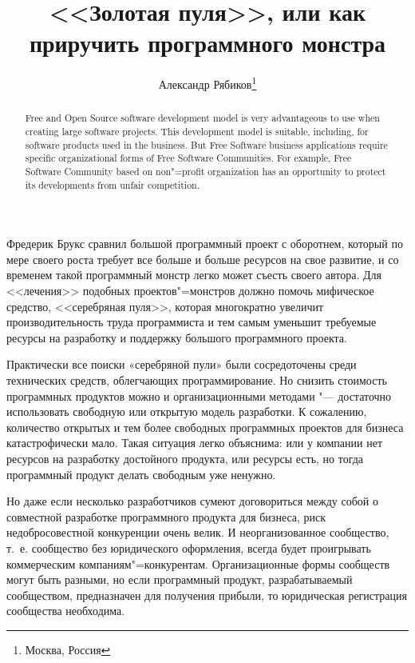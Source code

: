 \documentclass[10pt, a5paper]{article}
\begin{document}
\title{<<Золотая пуля>>, или как приручить программного монстра}%

\author{Александр Рябиков\footnote{Москва, Россия}}
\maketitle

\begin{abstract}
Free and Open Source software development model is very advantageous to use when creating large software projects. This development model is suitable, including, for software products used in the business. But Free Software business applications require specific organizational forms of Free Software Communities. For example, Free Software Community based on non"=profit organization has an opportunity to protect its developments from unfair competition.
\end{abstract}

Фредерик Брукс сравнил большой программный проект с оборотнем, который по мере своего роста требует все больше и больше ресурсов на свое развитие, и со временем такой программный монстр легко может съесть своего автора. Для <<лечения>> подобных проектов"=монстров должно помочь мифическое средство, <<серебряная пуля>>, которая многократно увеличит производительность труда программиста и тем самым уменьшит требуемые ресурсы на разработку и поддержку большого программного проекта.

Практически все поиски «серебряной пули» были сосредоточены среди технических средств, облегчающих программирование. Но снизить стоимость программных продуктов можно и организационными методами "--- достаточно использовать свободную или открытую модель разработки. К сожалению, количество открытых и тем более свободных программных проектов для бизнеса катастрофически мало. Такая ситуация легко объяснима: или у компании нет ресурсов на разработку достойного продукта, или ресурсы есть, но тогда программный продукт делать свободным уже ненужно.

Но даже если несколько разработчиков сумеют договориться между собой о совместной разработке программного продукта для бизнеса, риск недобросовестной конкуренции очень велик. И неорганизованное сообщество, т.~е. сообщество без юридического оформления, всегда будет проигрывать коммерческим компаниям"=конкурентам. Организационные формы сообществ могут быть разными, но если программный продукт, разрабатываемый сообществом, предназначен для получения прибыли, то юридическая регистрация сообщества необходима.
\end{document}
